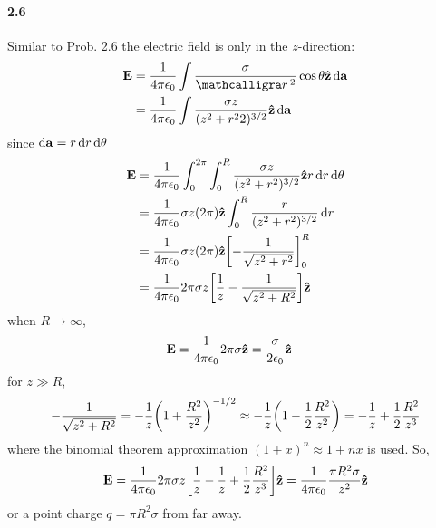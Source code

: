 \documentclass[../main.tex]{subfiles}
\begin{document}
\paragraph{2.6}
Similar to Prob. 2.6 the electric field is only in the $z$-direction:
\begin{align*}
    \vb{E} &= \frac{1}{4\pi\epsilon_0}
        \int \frac{\sigma}{\scriptr^2} \cos\theta \vu{z} \dd{\vb{a}} \\
    &= \frac{1}{4\pi\epsilon_0}
        \int \frac{\sigma z}{(z^2 + r^22)^{3/2}} \vu{z} \dd{\vb{a}}
\end{align*}
since $\dd{\vb{a}} = r \dd{r} \dd{\theta} $
\begin{align*}
    \vb{E} &= \frac{1}{4\pi\epsilon_0}
        \int_0^{2\pi} \int_0^R \frac{\sigma z}{(z^2 + r^2)^{3/2}} \vu{z} r \dd{r} \dd{\theta} \\
    &= \frac{1}{4\pi\epsilon_0}
        \sigma z (2\pi) \vu{z} \int_0^R \frac{r}{(z^2 + r^2)^{3/2}} \dd{r} \\
    &= \frac{1}{4\pi\epsilon_0}
        \sigma z (2\pi) \vu{z} \qt[
            -\frac{1}{\sqrt{z^2 + r^2}}
        ]_0^R \\
    &= \frac{1}{4\pi\epsilon_0}
        2\pi \sigma z  \qt[
            \frac{1}{z} -\frac{1}{\sqrt{z^2 + R^2}}
        ] \vu{z} \\
\end{align*}
when $R \to \infty$,
\begin{align*}
    \vb{E} &= \frac{1}{4\pi\epsilon_0} 2\pi \sigma \vu{z} = \frac{\sigma}{2\epsilon_0} \vu{z}
\end{align*}
for $z \gg R$,
\begin{align*}
    -\frac{1}{\sqrt{z^2 + R^2}} = -\frac{1}{z} \qt(1 + \frac{R^2}{z^2})^{-1/2} \approx -\frac{1}{z}
    \qt(1 - \frac{1}{2} \frac{R^2}{z^2}) = -\frac{1}{z} + \frac{1}{2} \frac{R^2}{z^3}
\end{align*}
where the binomial theorem approximation $(1 + x)^n \approx 1 + nx$ is used. So,
\begin{align*}
    \vb{E} = \frac{1}{4\pi\epsilon_0} 2\pi \sigma z \qt[
        \frac{1}{z} - \frac{1}{z} + \frac{1}{2} \frac{R^2}{z^3}
    ] \vu{z} 
    = \frac{1}{4\pi\epsilon_0} \frac{\pi R^2 \sigma }{z^2} \vu{z}
\end{align*}
or a point charge $q = \pi R^2 \sigma$ from far away.
\newpage
\end{document}
